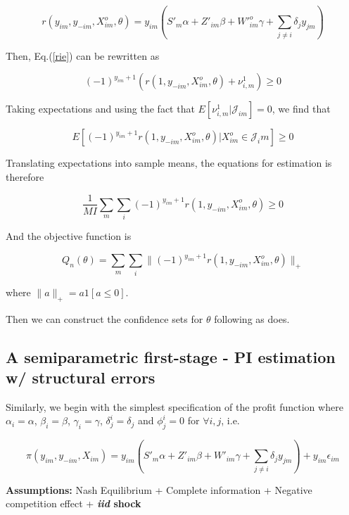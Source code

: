 \documentclass[a4paper]{article}
\begin{document}
$$r(y_{im},y_{-im},X^o_{im}, \theta) = y_{im}(S'_m\alpha+Z'_{im}\beta + W'^o_{im}\gamma + \sum_{j\neq i}\delta_j y_{jm})$$



Then, Eq.(\ref{rie}) can be rewritten as 

\begin{equation}
 (-1)^{y_{im}+1}(r(1,y_{-im},X^o_{im},\theta)+ \nu^1_{i,m} )\geq 0
\label{rie_PI}
\end{equation}

Taking expectations and using the fact that $E[\nu^1_{i,m}|\mathcal{J}_{im}] = 0$, we find that 


\begin{equation}
 E[(-1)^{y_{im}+1}r(1,y_{-im},X^o_{im},\theta)|X^o_{im} \in \mathcal{J}_im]\geq 0
\label{rie_PI_exp}
\end{equation}

Translating expectations into sample means, the equations for estimation is therefore

\begin{equation}
\dfrac{1}{MI}\sum_m\sum_i(-1)^{y_{im}+1}r(1,y_{-im},X^o_{im},\theta) \geq 0
\end{equation}

And the objective function is 

$$Q_n(\theta) = \sum_m\sum_i\|(-1)^{y_{im}+1}r(1,y_{-im},X^o_{im},\theta) \|_+$$

where $\|a\|_+ = a1[a \leq 0].$

Then we can construct the confidence sets for $\theta$ following \cite{chernozhukov2007estimation} as \cite{ciliberto2009market} does.

\subsection{A semiparametric first-stage - PI estimation w/ structural errors}


Similarly, we begin with the simplest specification of the profit function where $\alpha_i=\alpha$, $\beta_i=\beta$, $\gamma_i=\gamma$, $\delta_j^i=\delta_j$ and $\phi_j^i=0$ for $\forall i,j$, i.e.

\begin{equation}
\pi(y_{im},y_{-im},X_{im})=y_{im}(S'_m\alpha+Z'_{im}\beta+W'_{im}\gamma+\sum_{j\neq i}\delta_{j} y_{jm})+y_{im}\epsilon_{im} 
\end{equation}



\textbf{Assumptions:} Nash Equilibrium + Complete information + Negative competition effect + \textbf{\textit{iid} shock}
\end{document}
